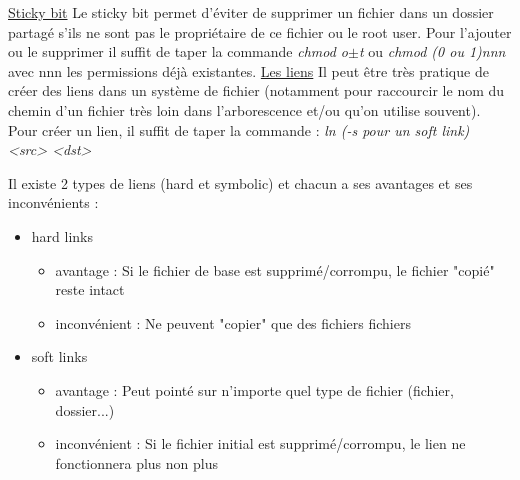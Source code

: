 \documentclass{article}
\begin{document}
\underline{Sticky bit}\newline
Le sticky bit permet d'éviter de supprimer un fichier dans un dossier partagé s'ils ne sont pas le propriétaire de ce fichier ou le root user. Pour l'ajouter ou le supprimer il suffit de taper la commande \textit{chmod o$\pm$t} ou \textit{chmod (0 ou 1)nnn} avec nnn les permissions déjà existantes.\newline\newline
\noindent\underline{Les liens}\newline
Il peut être très pratique de créer des liens dans un système de fichier (notamment pour raccourcir le nom du chemin d'un fichier très loin dans l'arborescence et/ou qu'on utilise souvent). Pour créer un lien, il suffit de taper la commande :\newline
\textit{ln (-s pour un soft link) <src> <dst>}\newline

Il existe 2 types de liens (hard et symbolic) et chacun a ses avantages et ses inconvénients :
\begin{itemize}
    \item hard links
        \begin{itemize}
            \item avantage : Si le fichier de base est supprimé/corrompu, le fichier "copié" reste intact 
            \item inconvénient : Ne peuvent "copier" que des fichiers fichiers
        \end{itemize}
    \item soft links
        \begin{itemize}
            \item avantage : Peut pointé sur n'importe quel type de fichier (fichier, dossier...)
            \item inconvénient : Si le fichier initial est supprimé/corrompu, le lien ne fonctionnera plus non plus
        \end{itemize}
\end{itemize}


\newpage
\end{document}
